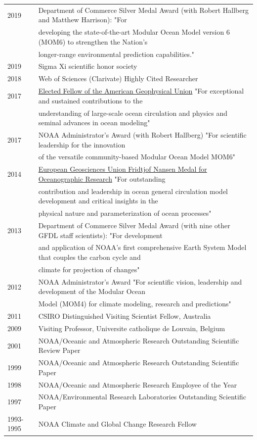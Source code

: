 \documentclass{article}
\begin{document}
\begin{tabular}{ll}
  2019 & Department of Commerce Silver Medal Award (with Robert Hallberg and Matthew Harrison): "For \\ &  developing the state-of-the-art Modular Ocean Model version 6 (MOM6) to strengthen the Nation's \\& longer-range environmental prediction capabilities."
  \\
  2019 & Sigma Xi scientific honor society 
  \\
  2018 & Web of Sciences (Clarivate) Highly Cited Researcher 
  \\
  2017 & \href{https://eos.org/agu-news/celebrating-the-2017-class-of-fellows}{Elected Fellow of the American Geophysical Union} "For exceptional and sustained contributions to the \\ &  understanding of large-scale ocean circulation and physics and seminal advances in ocean modeling"
\\
  2017 & NOAA Administrator's Award (with Robert Hallberg) "For scientific leadership for the innovation \\ & of the versatile  community-based Modular Ocean Model MOM6" 
  \\
  2014 & \href{http://www.egu.eu/awards-medals/fridtjof-nansen/2014/stephen-m-griffies/}{European Geosciences Union Fridtjof Nansen Medal for
         Oceanographic Research}  "For 
outstanding \\ & contribution and leadership in 
ocean general circulation model development 
and critical insights in the \\ & physical 
nature and parameterization of ocean processes"
\\
  2013 & Department of Commerce Silver Medal Award (with nine other
  GFDL staff scientists): 
  "For development \\ & and application of NOAA's first comprehensive  
  Earth System Model  
  that couples the carbon cycle and \\ & climate for projection of changes" \\
  2012 & NOAA Administrator's Award "For scientific vision, leadership
  and development of 
  the Modular Ocean \\ & Model (MOM4) for climate modeling, research and
  predictions" \\
  2011 & CSIRO Distinguished Visiting Scientist Fellow, Australia \\
  2009 & Visiting Professor, Universite catholique de Louvain, Belgium\\
  2001 & NOAA/Oceanic and Atmospheric Research Outstanding Scientific
  Review Paper\\
  1999 & NOAA/Oceanic and Atmospheric Research Outstanding Scientific Paper\\
  1998 & NOAA/Oceanic and Atmospheric Research Employee of the Year\\
  1997 & NOAA/Environmental Research Laboratories Outstanding Scientific Paper\\
  1993-1995 & NOAA Climate and Global Change Research Fellow
\end{tabular}
\end{document}
